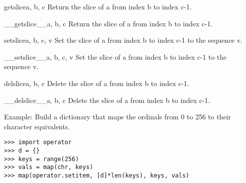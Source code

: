 \begin{funcdesc}{getslice}{a, b, c}
Return the slice of a from index b to index c-1.
\end{funcdesc}

\begin{funcdesc}{__getslice__}{a, b, c}
Return the slice of a from index b to index c-1.
\end{funcdesc}

\begin{funcdesc}{setslice}{a, b, c, v}
Set the slice of a from index b to index c-1 to the sequence v.
\end{funcdesc}

\begin{funcdesc}{__setslice__}{a, b, c, v}
Set the slice of a from index b to index c-1 to the sequence v.
\end{funcdesc}

\begin{funcdesc}{delslice}{a, b, c}
Delete the slice of a from index b to index c-1.
\end{funcdesc}

\begin{funcdesc}{__delslice__}{a, b, c}
Delete the slice of a from index b to index c-1.
\end{funcdesc}

Example: Build a dictionary that maps the ordinals from 0 to 256 to their
character equivalents.

\bcode\begin{verbatim}
>>> import operator
>>> d = {}
>>> keys = range(256)
>>> vals = map(chr, keys)
>>> map(operator.setitem, [d]*len(keys), keys, vals)
\end{verbatim}\ecode
